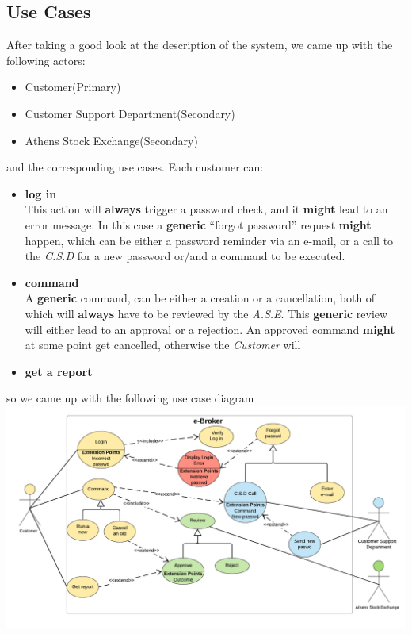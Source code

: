 \documentclass{article}
\begin{document}
\subsection{Use Cases}
After taking a good look at the description of the system, we came up with the following actors:
\begin{itemize}
\item Customer(Primary)
\item Customer Support Department(Secondary)
\item Athens Stock Exchange(Secondary)
\end{itemize}
 and the corresponding use cases. Each customer can:
\begin{itemize}
\item \textbf{log in}\\This action will \textbf{always} trigger a password check, and it 
\textbf{might} lead to an error message. In this case a \textbf{generic} ``forgot password'' request \textbf{might} happen, which can be either a password reminder via an e-mail, or a call to the \textit{C.S.D} for a new password or/and a command to be executed.
\item \textbf{command}\\A \textbf{generic} command, can be either a creation or a cancellation, both of which will \textbf{always} have to be reviewed by the \textit{A.S.E}. This \textbf{generic} review will either lead to an approval or a rejection. An approved command \textbf{might} at some point get cancelled, otherwise the \textit{Customer} will 
\item \textbf{get a report}
\end{itemize}
so we came up with the following use case diagram\\
\includegraphics[scale=0.3]{use_cases}

\newpage
\end{document}
